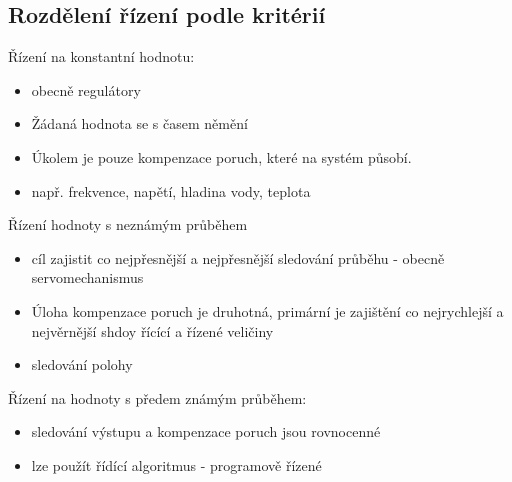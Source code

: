 \subsection*{Rozdělení řízení podle kritérií}
Řízení na konstantní hodnotu:
\begin{itemize}
    \item obecně regulátory
    \item Žádaná hodnota se s časem němění
    \item Úkolem je pouze kompenzace poruch, které na systém působí.
    \item např. frekvence, napětí, hladina vody, teplota
\end{itemize}
Řízení hodnoty s neznámým průběhem
\begin{itemize}
    \item cíl zajistit co nejpřesnější a nejpřesnější sledování průběhu - obecně servomechanismus
    \item Úloha kompenzace poruch je druhotná, primární je zajištění co nejrychlejší a nejvěrnější shdoy řícící a řízené veličiny
    \item sledování polohy
\end{itemize}
Řízení na hodnoty s předem známým průběhem:
\begin{itemize}
    \item sledování výstupu a kompenzace poruch jsou rovnocenné
    \item lze použít řídící algoritmus - programově řízené
\end{itemize}
